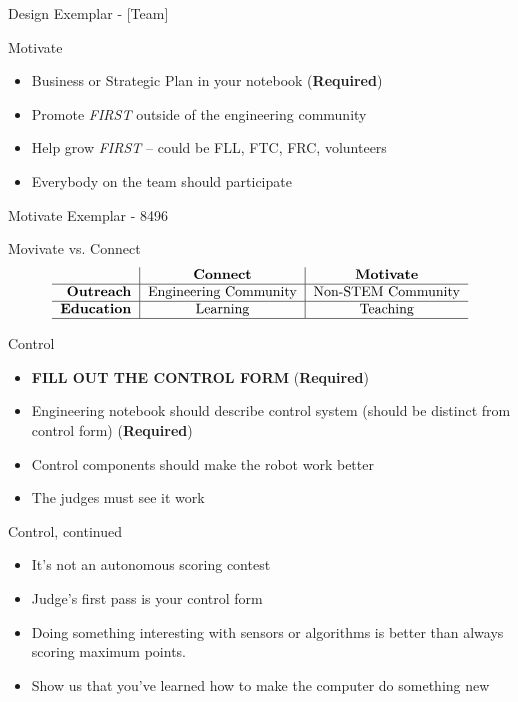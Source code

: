 \documentclass{beamer}
\begin{document}
  \begin{frame}{Design Exemplar - [Team]}
  \end{frame}

  \begin{frame}{Motivate}
    \begin{itemize}
    \item Business or Strategic Plan in your notebook (\textbf{Required})\pause
    \item Promote \textit{FIRST} outside of the engineering community \pause
    \item Help grow \textit{FIRST} -- could be FLL, FTC, FRC, volunteers \pause
    \item Everybody on the team should participate
    \end{itemize}
  \end{frame}


  \begin{frame}{Motivate Exemplar - 8496}
  \end{frame}

  \begin{frame}{Movivate vs. Connect}
    \[
    \begin{tabular}{r|c|c}
       & \textbf{Connect} & \textbf{Motivate} \\ \hline
      \textbf{Outreach} & Engineering Community & Non-STEM Community \\ \hline
      \textbf{Education} & Learning & Teaching \\
      \hline
    \end{tabular}
    \]
  \end{frame}

  \begin{frame}{Control}
    \begin{itemize}
    \item \textbf{FILL OUT THE CONTROL FORM} (\textbf{Required})\pause
    \item Engineering notebook should describe control system
      (should be distinct from control form) (\textbf{Required})\pause
    \item Control components should make the robot work better \pause
    \item The judges must see it work
    \end{itemize}
  \end{frame}

  \begin{frame}{Control, continued}
    \begin{itemize}
    \item It's not an autonomous scoring contest \pause
    \item Judge's first pass is your control form \pause
    \item Doing something interesting with sensors or algorithms
      is better than always scoring maximum points. \pause
    \item Show us that you've learned how to make the computer do
      something new
    \end{itemize}
  \end{frame}
\end{document}
